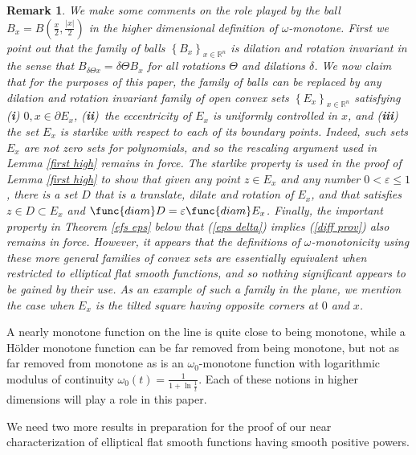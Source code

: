 \documentclass{amsart}
\theoremstyle{plain}
\newtheorem{remark}[theorem]{Remark}
\numberwithin{equation}{section}
\begin{document}
\begin{remark}
\label{ball remark}We make some comments on the role played by the ball $%
B_{x}=B\left( \frac{x}{2},\frac{\left\vert x\right\vert }{2}\right) $ in the
higher dimensional definition of $\omega $-monotone. First we point out that
the family of balls $\left\{ B_{x}\right\} _{x\in \mathbb{R}^{n}}$ is \emph{%
dilation and rotation invariant} in the sense that $B_{\delta \Theta
x}=\delta \Theta B_{x}$ for all rotations $\Theta $ and dilations $\delta $.
We now claim that for the purposes of this paper, the family of balls can be
replaced by any \emph{dilation and rotation invariant} family of open convex
sets $\left\{ E_{x}\right\} _{x\in \mathbb{R}^{n}}$ satisfying (\textbf{i}) $%
0,x\in \partial E_{x}$, (\textbf{ii})\ the eccentricity of $E_{x}$ is
uniformly controlled in $x$, and (\textbf{iii}) the set $E_{x}$ is starlike
with respect to each of its boundary points. Indeed, such sets $E_{x}$ are
not zero sets for polynomials, and so the rescaling argument used in Lemma %
\ref{first high} remains in force. The starlike property is used in the
proof of Lemma \ref{first high} to show that given any point $z\in E_{x}$
and any number $0<\varepsilon \leq 1$, there is a set $D$ that is a
translate, dilate and rotation of $E_{x}$, and that satisfies $z\in D\subset
E_{x}$ and $\func{diam}D=\varepsilon \func{diam}E_{x}$. Finally, the
important property in Theorem \ref{efs eps} below that (\ref{eps delta})
implies (\ref{diff prov}) also remains in force. However, it appears that
the definitions of $\omega $-monotonicity using these more general families
of convex sets are essentially equivalent when restricted to elliptical flat
smooth functions, and so nothing significant appears to be gained by their
use.\newline
As an example of such a family in the plane, we mention the case when $E_{x}$
is the tilted square having opposite corners at $0$ and $x$.
\end{remark}

A nearly monotone function on the line is quite close to being monotone,
while a H\"{o}lder monotone function can be far removed from being monotone,
but not as far removed from monotone as is an $\omega _{0}$-monotone
function with logarithmic modulus of continuity $\omega _{0}\left( t\right) =%
\frac{1}{1+\ln \frac{1}{t}}$. Each of these notions in higher dimensions
will play a role in this paper.

We need two more results in preparation for the proof of our near
characterization of elliptical flat smooth functions having smooth positive
powers.
\end{document}
